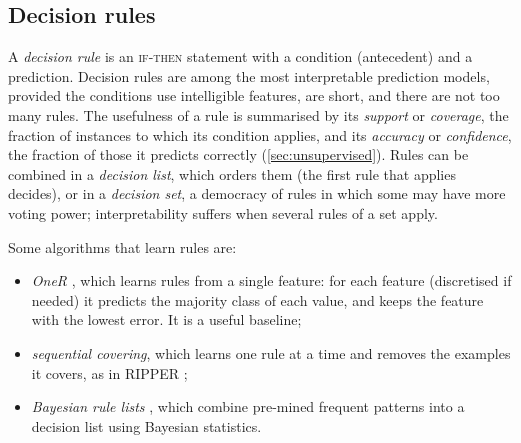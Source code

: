 \subsection{Decision rules}

A \emph{decision rule} is an \textsc{if-then} statement with a condition (antecedent) and a
prediction. Decision rules are among the most interpretable prediction models, provided the
conditions use intelligible features, are short, and there are not too many rules. The usefulness of
a rule is summarised by its \emph{support} or \emph{coverage}, the fraction of instances to which its
condition applies, and its \emph{accuracy} or \emph{confidence}, the fraction of those it predicts
correctly (\cref{sec:unsupervised}). Rules can be combined in a \emph{decision list}, which orders
them (the first rule that applies decides), or in a \emph{decision set}, a democracy of rules in
which some may have more voting power; interpretability suffers when several rules of a set apply.

Some algorithms that learn rules are:
\begin{itemize}
  \item \emph{OneR} \citep{holte1993very}, which learns rules from a single feature: for each
        feature (discretised if needed) it predicts the majority class of each value, and keeps the
        feature with the lowest error. It is a useful baseline;
  \item \emph{sequential covering}, which learns one rule at a time and removes the examples it
        covers, as in RIPPER \citep{cohen1995fast};
  \item \emph{Bayesian rule lists} \citep{letham2015interpretable}, which combine pre-mined frequent
        patterns into a decision list using Bayesian statistics.
\end{itemize}

